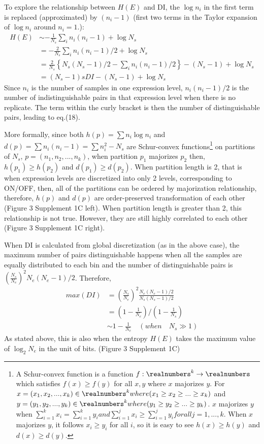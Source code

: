To explore the relationship between $H(E)$ and DI, the $\log n_i$ in the first term is replaced (approximated) by $(n_i-1)$ (first two terms in the Taylor expansion of $\log n_i$ around $n_i=1$.):
\begin{align}
H(E) &\sim -\frac{1}{N_s}\sum_{i}n_i (n_i-1) + \log N_s \\
	 &= -\frac{2}{N_s}\sum_{i}n_i (n_i-1)/2 + \log N_s \\
     &=  \frac{2}{N_s}\left\{N_s(N_s-1)/2 - \sum_{i}n_i (n_i-1)/2\right\} - (N_s-1) + \log N_s \\
     &= (N_s-1) sDI - (N_s-1) + \log N_s 
\end{align}
Since $n_i$ is the number of samples in one expression level, $n_i(n_i-1)/2$ is the number of indistinguishable pairs in that expression level when there is no replicate. The term within the curly bracket is then the number of distinguishable pairs, leading to eq.(18). 

More formally, since both $h(p) = \sum{n_i\log n_i}$ and $d(p) = \sum n_i(n_i-1) = \sum n_i^2 - N_s$ are Schur-convex functions\footnote{A Schur-convex function is a function $f:\realnumbers^k \rightarrow \realnumbers$ which satisfies $f(x) \geq f(y)$ for all $x,y$ where $x$ majorizes $y$. For $x=(x_1,x_2,...,x_k) \in \realnumbers^k where (x_1 \geq x_2 \geq ... \geq x_k) $ and $y=(y_1,y_2,...,y_k) \in \realnumbers^k where (y_1 \geq y_2 \geq ... \geq y_k)$. $x$ majorizes $y$ when $\sum_{i=1}^{k} x_i = \sum_{i=1}^{k} y_i and \sum_{i=1}^{j} x_i \geq \sum_{i=1}^{j} y_i for all j=1,...,k$. When $x$ majorizes $y$, it follows $x_i \geq y_i$ for all $i$, so it is easy to see $h(x) \geq h(y)$ and $d(x) \geq d(y)$.} on partitions of $N_s$,  $p=(n_1,n_2,...,n_k)$, when partition $p_1$ majorizes $p_2$ then, $h(p_1)\geq h(p_2)$ and $d(p_1)\geq d(p_2)$. When partition length is 2, that is when expression levels are discretized into only 2 levels, corresponding to ON/OFF, then, all of the partitions can be ordered by majorization relationship, therefore, $h(p)$ and $d(p)$ are order-preserved transformation of each other (Figure 3 Supplement 1C left). When partition length is greater than 2, this relationship is not true. However, they are still highly correlated to each other (Figure 3 Supplement 1C right). 

When DI is calculated from global discretization (as in the above case), the maximum number of pairs distinguishable happens when all the samples are equally distributed to each bin and the number of distinguishable pairs is $\left( \frac{N_s}{N_e}\right)^2N_e(N_e-1)/2$. Therefore,
\begin{align}
max(DI) &= \left( \frac{N_s}{N_e}\right)^2 \frac{N_e(N_e-1)/2}{N_s(N_s-1)/2}\\
		&= \left( 1 - \frac{1}{N_e} \right) / \left( 1 - \frac{1}{N_s} \right) \\
        &\sim 1 - \frac{1}{N_e} \quad(when\quad N_s \gg 1)
\end{align}
As stated above, this is also when the entropy $H(E)$ takes the maximum value of $\log_{2} N_e$ in the unit of bits. (Figure 3 Supplement 1C)
